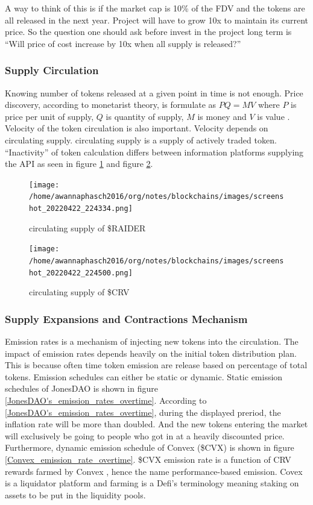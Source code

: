 \documentclass{IEEEtran}
\begin{document}
A way to think of this is if the market cap is 10\% of the FDV and the tokens are all released in the next year. Project will have to grow 10x to maintain its current price. So the question one should ask before invest in the project long term is ``Will price of cost increase by 10x when all supply is released?''

\subsubsection{Supply Circulation}
\label{sec:orga0e6406}
Knowing number of tokens released at a given point in time is not enough. Price discovery, according to monetarist theory, is formulate as \(PQ=MV\) where \(P\) is price per unit of supply, \(Q\) is quantity of supply, \(M\) is money and \(V\) is value \cite{walsh2017monetary}. Velocity of the token circulation is also important. Velocity depends on circulating supply. circulating supply is a supply of actively traded token. ``Inactivity'' of token calculation differs between information platforms supplying the API as seen in figure \ref{circulating_supply_of_$RAIDER} and figure \ref{circulating_supply_of_$CRV}.

\begin{figure}[htbp]
\centering
\texttt{[image: /home/awannaphasch2016/org/notes/blockchains/images/screenshot\_20220422\_224334.png]}
\caption{\label{circulating_supply_of_$RAIDER}circulating supply of \$RAIDER}
\end{figure}

\begin{figure}[htbp]
\centering
\texttt{[image: /home/awannaphasch2016/org/notes/blockchains/images/screenshot\_20220422\_224500.png]}
\caption{\label{circulating_supply_of_$CRV}circulating supply of \$CRV}
\end{figure}

\subsubsection{Supply Expansions and Contractions Mechanism}
\label{sec:org8d1144d}
Emission rates is a mechanism of injecting new tokens into the circulation. The impact of emission rates depends heavily on the initial token distribution plan. This is because often time token emission are release based on percentage of total tokens. Emission schedules can either be static or dynamic. Static emission schedules of JonesDAO is shown in figure \ref{JonesDAO's_emission_rates_overtime}. According to \ref{JonesDAO's_emission_rates_overtime}, during the displayed preriod, the inflation rate will be more than doubled. And the new tokens entering the market will exclusively be going to people who got in at a heavily discounted price. Furthermore, dynamic emission schedule of Convex (\$CVX) is shown in figure \ref{Convex_emission_rate_overtime}. \$CVX emission rate is a function of CRV rewards farmed by Convex \cite{covex2021tokenomics}, hence the name performance-based emission. Covex is a liquidator platform and farming is a Defi's terminology meaning staking on assets to be put in the liquidity pools.
\end{document}
